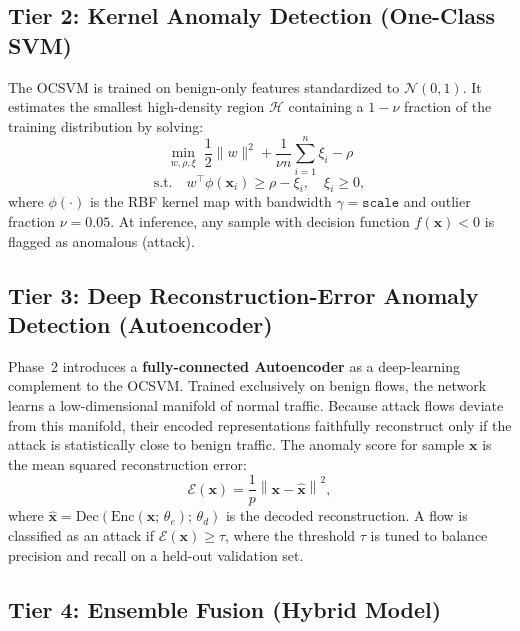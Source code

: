 \documentclass[10pt,conference]{IEEEtran}
\begin{document}
\subsection{Tier 2: Kernel Anomaly Detection (One-Class SVM)}

The OCSVM \cite{scholkopf2001} is trained on benign-only
features standardized to $\mathcal{N}(0,1)$. It estimates the smallest
high-density region $\mathcal{H}$ containing a $1-\nu$ fraction of
the training distribution by solving:
\begin{equation}
\min_{w,\rho,\xi}\;
  \frac{1}{2}\|w\|^2
  + \frac{1}{\nu n}\sum_{i=1}^{n}\xi_i - \rho
\label{eq:ocsvm}
\end{equation}
\begin{equation}
\text{s.t.}\quad
  w^\top\phi(\mathbf{x}_i) \ge \rho - \xi_i,\quad \xi_i \ge 0,
\label{eq:ocsvm_cst}
\end{equation}
where $\phi(\cdot)$ is the RBF kernel map with bandwidth $\gamma =
\texttt{scale}$ and outlier fraction $\nu = 0.05$. At inference, any
sample with decision function $f(\mathbf{x}) < 0$ is flagged as
anomalous (attack).

\subsection{Tier 3: Deep Reconstruction-Error Anomaly Detection (Autoencoder)}

Phase~2 introduces a \textbf{fully-connected Autoencoder} as a
deep-learning complement to the OCSVM. Trained exclusively on benign
flows, the network learns a low-dimensional manifold of normal traffic.
Because attack flows deviate from this manifold, their encoded
representations faithfully reconstruct only if the attack is
statistically close to benign traffic. The anomaly score for sample
$\mathbf{x}$ is the mean squared reconstruction error:
\begin{equation}
  \mathcal{E}(\mathbf{x})
  = \frac{1}{p}\left\|\mathbf{x} - \hat{\mathbf{x}}\right\|^2,
  \label{eq:ae_score}
\end{equation}
where $\hat{\mathbf{x}} = \text{Dec}\!\left(\text{Enc}(\mathbf{x};\,
\theta_e);\,\theta_d\right)$ is the decoded reconstruction. A flow is
classified as an attack if $\mathcal{E}(\mathbf{x}) \geq \tau$, where
the threshold $\tau$ is tuned to balance precision and recall on a
held-out validation set.

\subsection{Tier 4: Ensemble Fusion (Hybrid Model)}
\end{document}
